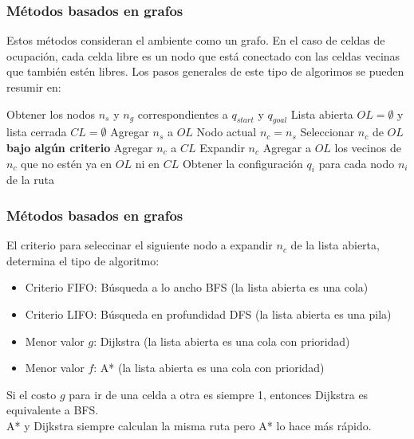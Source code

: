 \documentclass[10pt,spanish,aspectratio=1610]{beamer}
\begin{document}
\begin{frame}\frametitle{Métodos basados en grafos}
  Estos métodos consideran el ambiente como un grafo. En el caso de celdas de ocupación, cada celda libre es un nodo que está conectado con las celdas vecinas que también estén libres. Los pasos generales de este tipo de algorimos se pueden resumir en:
  \[\]
  \begin{algorithm}[H]
    \footnotesize
    \DontPrintSemicolon
    Obtener los nodos $n_s$ y $n_g$ correspondientes a $q_{start}$ y $q_{goal}$\;
    Lista abierta $OL = \emptyset$ y lista cerrada $CL = \emptyset$\;
    Agregar $n_s$ a $OL$\;
    Nodo actual $n_c = n_s$\;
    {
      Seleccionar $n_c$ de $OL$ \textbf{bajo algún criterio}\;
      Agregar $n_c$ a $CL$\;
      Expandir $n_c$\;
      Agregar a $OL$ los vecinos de $n_c$ que no estén ya en $OL$ ni en $CL$\;
    }
    Obtener la configuración $q_i$ para cada nodo $n_i$ de la ruta\;
  \end{algorithm}
\end{frame}

\begin{frame}\frametitle{Métodos basados en grafos}
  El criterio para seleccinar el siguiente nodo a expandir $n_c$ de la lista abierta, determina el tipo de algoritmo:
  \begin{itemize}
  \item Criterio FIFO: Búsqueda a lo ancho BFS (la lista abierta es una cola)
  \item Criterio LIFO:  Búsqueda en profundidad DFS (la lista abierta es una pila)
  \item Menor valor $g$: Dijkstra (la lista abierta es una cola con prioridad)
  \item Menor valor $f$: A* (la lista abierta es una cola con prioridad)
  \end{itemize}
  Si el costo $g$ para ir de una celda a otra es siempre 1, entonces Dijkstra es equivalente a BFS. \\
  A* y Dijkstra siempre calculan la misma ruta pero A* lo hace más rápido. 
\end{frame}
\end{document}
